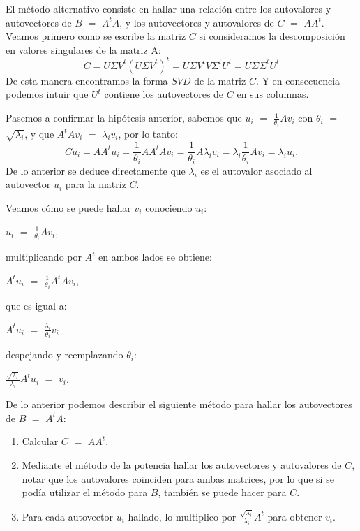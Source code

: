 
El método alternativo consiste en hallar una relación entre los autovalores y autovectores de $B$ $=$ $A^{t} A$, y los autovectores y autovalores de $C$ $=$ $A A^{t}$.
Veamos primero como se escribe la matriz $C$ si consideramos la descomposición en valores singulares de la matriz A:
\begin{equation}
C = U \Sigma V^t (U \Sigma V^t)^{t} = U \Sigma V^t V \Sigma^{t} U^{t}  = U \Sigma \Sigma^{t} U^{t} 
\end{equation}
De esta manera encontramos la forma $SVD$ de la matriz $C$. Y en consecuencia podemos intuir que $U^{t}$ contiene los autovectores de $C$ en sus columnas.

Pasemos a confirmar la hipótesis anterior, sabemos que $u_{i}$ $=$ $\frac{1}{ \theta_{i} } A v_{i}$ con $\theta_{i}$ $=$ $\sqrt{ \lambda_{i} }$, y que $A^{t} A v_{i}$ $=$ $\lambda_{i} v_{i}$, por lo tanto:
\begin{equation}
C u_{i} = A A^{t} u_{i} = \frac{1}{ \theta_{i} } A A^{t}  A v_{i} =  \frac{ 1 }{  \theta_{i} } A  \lambda_{i} v_{i} =  \lambda_{i} \frac{ 1 }{ \theta_{i} } A  v_{i} = \lambda_{i} u_{i}.
\end{equation}
De lo anterior se deduce directamente que $\lambda_{i}$ es el autovalor asociado al autovector $u_{i}$ para la matriz $C$.

Veamos cómo se puede hallar $v_{i}$ conociendo $u_{i}$:

$u_{i}$ $=$ $\frac{1}{ \theta_{i} } A v_{i}$, 

multiplicando por $A^{t}$ en ambos lados se obtiene:

$A^{t} u_{i}$ $=$ $ \frac{1}{ \theta_{i} } A^{t} A v_{i}$, 

que es igual a: 

$A^{t} u_{i}$ $=$ $\frac{\lambda_{i}}{ \theta_{i} }  v_{i}$ 

despejando y reemplazando $\theta_{i}$:

$\frac{ \sqrt{\lambda_{i} } }{ \lambda_{i} }  A^{t} u_{i}$ $=$ $v_{i}$.

De lo anterior podemos describir el siguiente método para hallar los autovectores de $B$ $=$ $A^{t} A$:
\begin{enumerate}
\setlength{\itemindent}{0.2in}
\item Calcular $C$ $=$ $A A^{t}$.
\item Mediante el método de la potencia hallar los autovectores y autovalores de $C$, notar que los autovalores coinciden para ambas matrices, por lo que si  se podía utilizar el método para $B$, también se puede hacer para $C$.
\item Para cada autovector $u_{i}$ hallado, lo multiplico por $\frac{ \sqrt{\lambda_{i} } }{ \lambda_{i} }  A^{t}$ para obtener $v_{i}$.
\end{enumerate}


